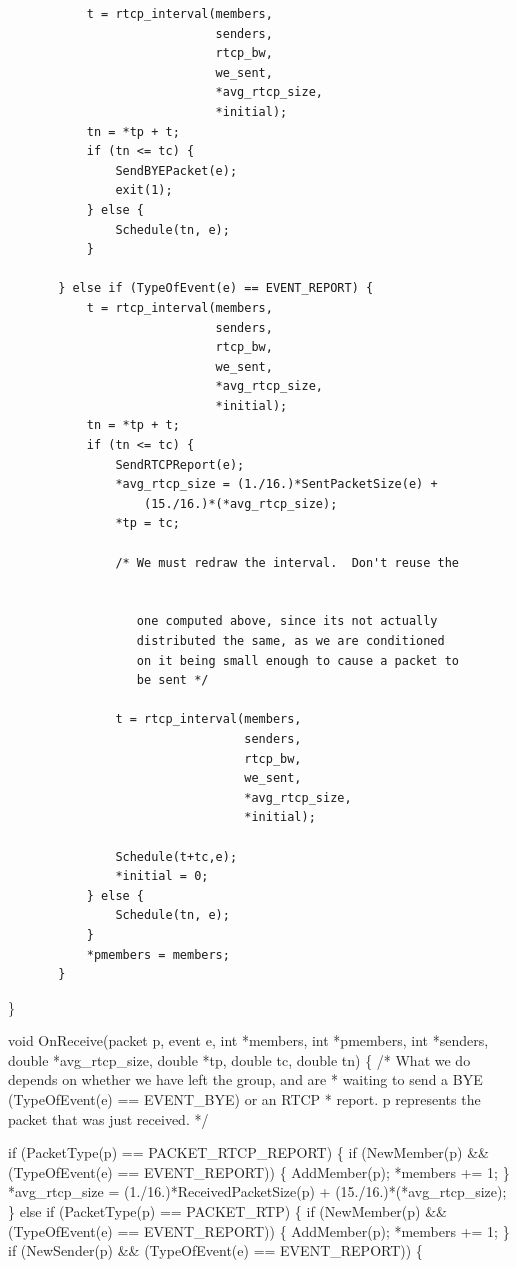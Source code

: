 \documentclass{article}
\begin{document}
\begin{verbatim}
           t = rtcp_interval(members,
                             senders,
                             rtcp_bw,
                             we_sent,
                             *avg_rtcp_size,
                             *initial);
           tn = *tp + t;
           if (tn <= tc) {
               SendBYEPacket(e);
               exit(1);
           } else {
               Schedule(tn, e);
           }

       } else if (TypeOfEvent(e) == EVENT_REPORT) {
           t = rtcp_interval(members,
                             senders,
                             rtcp_bw,
                             we_sent,
                             *avg_rtcp_size,
                             *initial);
           tn = *tp + t;
           if (tn <= tc) {
               SendRTCPReport(e);
               *avg_rtcp_size = (1./16.)*SentPacketSize(e) +
                   (15./16.)*(*avg_rtcp_size);
               *tp = tc;

               /* We must redraw the interval.  Don't reuse the


                  one computed above, since its not actually
                  distributed the same, as we are conditioned
                  on it being small enough to cause a packet to
                  be sent */

               t = rtcp_interval(members,
                                 senders,
                                 rtcp_bw,
                                 we_sent,
                                 *avg_rtcp_size,
                                 *initial);

               Schedule(t+tc,e);
               *initial = 0;
           } else {
               Schedule(tn, e);
           }
           *pmembers = members;
       }
\end{verbatim}

\}

void OnReceive(packet p, event e, int *members, int *pmembers, int *senders, double *avg\_rtcp\_size, double *tp, double tc, double tn) \{ /* What we do depends on whether we have left the group, and are * waiting to send a BYE (TypeOfEvent(e) == EVENT\_BYE) or an RTCP * report.  p represents the packet that was just received.  */

if (PacketType(p) == PACKET\_RTCP\_REPORT) \{ if (NewMember(p) \&\& (TypeOfEvent(e) == EVENT\_REPORT)) \{ AddMember(p); *members += 1; \} *avg\_rtcp\_size = (1./16.)*ReceivedPacketSize(p) + (15./16.)*(*avg\_rtcp\_size); \} else if (PacketType(p) == PACKET\_RTP) \{ if (NewMember(p) \&\& (TypeOfEvent(e) == EVENT\_REPORT)) \{ AddMember(p); *members += 1; \} if (NewSender(p) \&\& (TypeOfEvent(e) == EVENT\_REPORT)) \{
\end{document}
